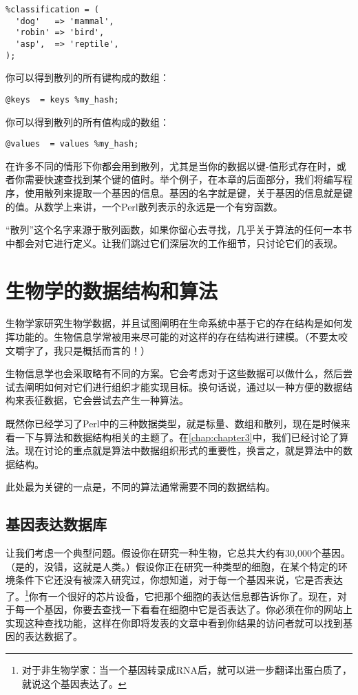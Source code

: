 \begin{lstlisting}
%classification = (
  'dog'   => 'mammal',
  'robin' => 'bird',
  'asp',  => 'reptile',
);
\end{lstlisting}

你可以得到散列的所有键构成的数组：

\begin{lstlisting}
@keys  = keys %my_hash;
\end{lstlisting}

你可以得到散列的所有值构成的数组：

\begin{lstlisting}
@values  = values %my_hash;
\end{lstlisting}

在许多不同的情形下你都会用到散列，尤其是当你的数据以键-值形式存在时，或者你需要快速查找到某个键的值时。举个例子，在本章的后面部分，我们将编写程序，使用散列来提取一个基因的信息。基因的名字就是键，关于基因的信息就是键的值。从数学上来讲，一个Perl散列表示的永远是一个有穷函数。

“散列”这个名字来源于散列函数，如果你留心去寻找，几乎关于算法的任何一本书中都会对它进行定义。让我们跳过它们深层次的工作细节，只讨论它们的表现。

\section{生物学的数据结构和算法}
生物学家研究生物学数据，并且试图阐明在生命系统中基于它的存在结构是如何发挥功能的。生物信息学常被用来尽可能的对这样的存在结构进行建模。（不要太咬文嚼字了，我只是概括而言的！）

生物信息学也会采取略有不同的方案。它会考虑对于这些数据可以做什么，然后尝试去阐明如何对它们进行组织才能实现目标。换句话说，通过以一种方便的数据结构来表征数据，它会尝试去产生一种算法。

既然你已经学习了Perl中的三种数据类型，就是标量、数组和散列，现在是时候来看一下与算法和数据结构相关的主题了。在\autoref{chap:chapter3}中，我们已经讨论了算法。现在讨论的重点就是算法中数据组织形式的重要性，换言之，就是算法中的数据结构。

此处最为关键的一点是，不同的算法通常需要不同的数据结构。

\subsection{基因表达数据库}
让我们考虑一个典型问题。假设你在研究一种生物，它总共大约有30,000个基因。（是的，没错，这就是人类。）假设你正在研究一种类型的细胞，在某个特定的环境条件下它还没有被深入研究过，你想知道，对于每一个基因来说，它是否表达了。\footnote{对于非生物学家：当一个基因转录成RNA后，就可以进一步翻译出蛋白质了，就说这个基因表达了。}你有一个很好的芯片设备，它把那个细胞的表达信息都告诉你了。现在，对于每一个基因，你要去查找一下看看在细胞中它是否表达了。你必须在你的网站上实现这种查找功能，这样在你即将发表的文章中看到你结果的访问者就可以找到基因的表达数据了。

